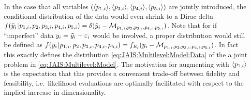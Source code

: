 In the case that all variables \((\langle{p_{1,i}}\rangle,\langle{p_{3,i}}\rangle,\langle{p_{4,i}}\rangle,\langle{p_{5,i}}\rangle)\) are jointly introduced, the conditional distribution of the data would even shrink to a Dirac delta
\(f (\tilde{y}_i {\:\!}|{\:\!} p_{1,i},p_2,p_{3,i},p_{4,i},p_{5,i}) = \delta(\tilde{y}_i-\mathcal{M}_{p_{1,i},p_2,p_{3,i},p_{4,i},p_{5,i}})\).
Note that for if ``imperfect'' data \(y_i = \tilde{y}_i + \varepsilon_i\) would be involved, a proper distribution would still be defined as
\(f (y_i {\:\!}|{\:\!} p_{1,i},p_2,p_{3,i},p_{4,i},p_{5,i}) = f_{E_i} (y_i -\mathcal{M}_{p_{1,i},p_2,p_{3,i},p_{4,i},p_{5,i}})\).
In fact this exactly defines the distribution \cref{eq:JAIS:Multilevel:Model:Data} of the a joint problem in \cref{eq:JAIS:Multilevel:Model}.
The motivation for augmenting with \(\langle{p_{1,i}}\rangle\) is the expectation that this provides a convenient trade-off between fidelity and feasibility,
i.e.\ likelihood evaluations are optimally facilitated with respect to the implied increase in dimensionality.

